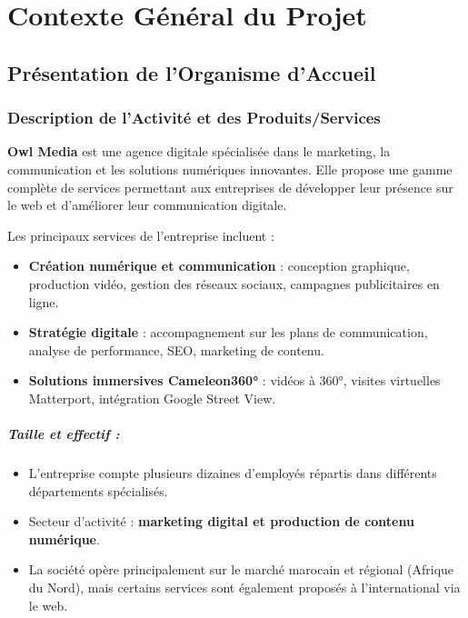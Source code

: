 \chapter{Contexte Général du Projet}
\label{chap:contexte_general}

\section{Présentation de l'Organisme d'Accueil}

\subsection{Description de l'Activité et des Produits/Services}
\textbf{Owl Media} est une agence digitale spécialisée dans le marketing, la communication et les solutions numériques innovantes. Elle propose une gamme complète de services permettant aux entreprises de développer leur présence sur le web et d'améliorer leur communication digitale.

Les principaux services de l'entreprise incluent :
\begin{itemize}
    \item \textbf{Création numérique et communication} : conception graphique, production vidéo, gestion des réseaux sociaux, campagnes publicitaires en ligne.
    \item \textbf{Stratégie digitale} : accompagnement sur les plans de communication, analyse de performance, SEO, marketing de contenu.
    \item \textbf{Solutions immersives Cameleon360°} : vidéos à 360°, visites virtuelles Matterport, intégration Google Street View.
\end{itemize}

\paragraph{Taille et effectif :}
\begin{itemize}
    \item L'entreprise compte plusieurs dizaines d'employés répartis dans différents départements spécialisés.
    \item Secteur d'activité : \textbf{marketing digital et production de contenu numérique}.
    \item La société opère principalement sur le marché marocain et régional (Afrique du Nord), mais certains services sont également proposés à l'international via le web.
\end{itemize}


